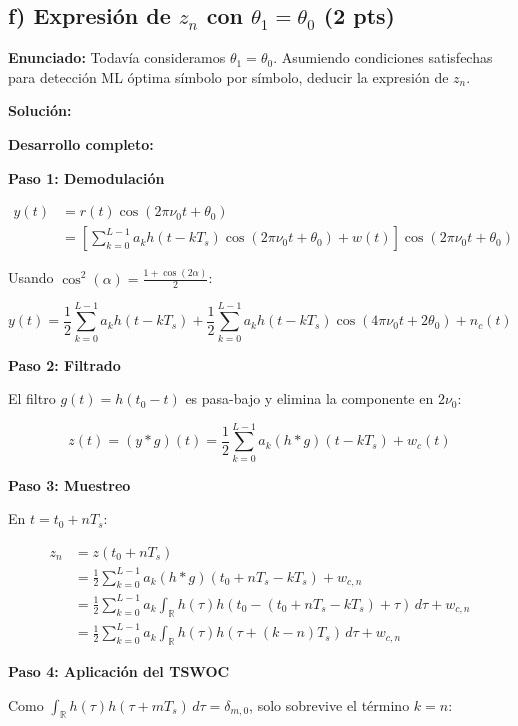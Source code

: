 \documentclass[11pt,a4paper]{article}
\begin{document}
\subsection*{f) Expresi\'on de $z_n$ con $\theta_1 = \theta_0$ (2 pts)}

\textbf{Enunciado:} Todav\'ia consideramos $\theta_1 = \theta_0$. Asumiendo condiciones satisfechas para detecci\'on ML \'optima s\'imbolo por s\'imbolo, deducir la expresi\'on de $z_n$.

\vspace{0.3cm}
\textbf{Soluci\'on:}

\textbf{Desarrollo completo:}

\textbf{Paso 1: Demodulaci\'on}

\begin{align*}
y(t) &= r(t) \cos(2\pi\nu_0 t + \theta_0) \\
&= \left[\sum_{k=0}^{L-1} a_k h(t-kT_s)\cos(2\pi\nu_0 t + \theta_0) + w(t)\right] \cos(2\pi\nu_0 t + \theta_0)
\end{align*}

Usando $\cos^2(\alpha) = \frac{1 + \cos(2\alpha)}{2}$:

\[
y(t) = \frac{1}{2}\sum_{k=0}^{L-1} a_k h(t-kT_s) + \frac{1}{2}\sum_{k=0}^{L-1} a_k h(t-kT_s)\cos(4\pi\nu_0 t + 2\theta_0) + n_c(t)
\]

\textbf{Paso 2: Filtrado}

El filtro $g(t) = h(t_0 - t)$ es pasa-bajo y elimina la componente en $2\nu_0$:

\[
z(t) = (y * g)(t) = \frac{1}{2}\sum_{k=0}^{L-1} a_k (h * g)(t-kT_s) + w_c(t)
\]

\textbf{Paso 3: Muestreo}

En $t = t_0 + nT_s$:

\begin{align*}
z_n &= z(t_0 + nT_s) \\
&= \frac{1}{2}\sum_{k=0}^{L-1} a_k (h * g)(t_0 + nT_s - kT_s) + w_{c,n} \\
&= \frac{1}{2}\sum_{k=0}^{L-1} a_k \int_{\mathbb{R}} h(\tau) h(t_0 - (t_0 + nT_s - kT_s) + \tau)\, d\tau + w_{c,n} \\
&= \frac{1}{2}\sum_{k=0}^{L-1} a_k \int_{\mathbb{R}} h(\tau) h(\tau + (k-n)T_s)\, d\tau + w_{c,n}
\end{align*}

\textbf{Paso 4: Aplicaci\'on del TSWOC}

Como $\int_{\mathbb{R}} h(\tau) h(\tau + mT_s)\, d\tau = \delta_{m,0}$, solo sobrevive el t\'ermino $k = n$:
\end{document}
